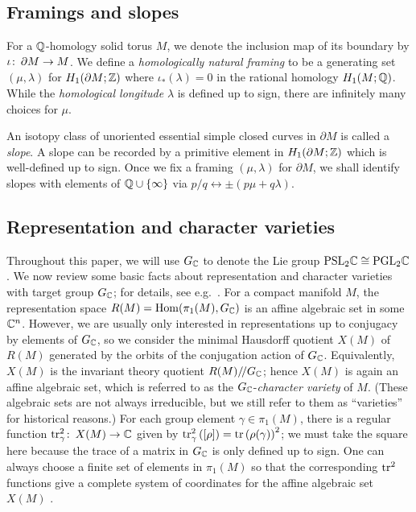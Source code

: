 \documentclass[tikz, sepfignums, defaultenums]{nmd/article}
\newcommand{\GC}{G_\C}
\newcommand{\sslash}{/\mkern-3mu/}
\newcommand{\inc}{\iota}
\begin{document}
\subsection{Framings and slopes}
\label{sec:framings}

For a ${\mathbb Q}$-homology solid torus $M$, we denote the inclusion map of
its boundary by $\inc \maps \partial M \to M$.  We define a
\emph{homologically natural framing} to be a generating set
$(\mu, \lambda)$ for $H_1(\partial M; {\mathbb Z})$ where
$\inc_*(\lambda) = 0$ in the rational homology $H_1(M; {\mathbb Q})$.  While
the \emph{homological longitude} $\lambda$ is defined up to sign,
there are infinitely many choices for $\mu$.

An isotopy class of unoriented essential simple closed curves in
$\partial M$ is called a \emph{slope}.  A slope can be recorded by a
primitive element in $H_1(\partial M; {\mathbb Z})$ which is well-defined up to
sign.  Once we fix a framing $(\mu, \lambda)$ for $\partial M$, we
shall identify slopes with elements of ${\mathbb Q} \cup \{\infty\}$ via
$p/q \leftrightarrow \pm(p \mu + q \lambda)$.

\subsection{Representation and character varieties} 
\label{sec:repcharvar}

Throughout this paper, we will use $\GC$ to denote the Lie group
$\mathrm{PSL}_{2} {\mathbb C} \cong \mathrm{PGL}_{2} {\mathbb C}$.  We now review some basic facts about
representation and character varieties with target group $\GC$; for
details, see e.g.~\cite{HeusenerPorti2004}.  For a compact manifold
$M$, the representation space $R(M) = \Hom(\pi_1(M), \GC)$ is an
affine algebraic set in some ${\mathbb C}^n$.  However, we are usually only
interested in representations up to conjugacy by elements of $\GC$, so
we consider the minimal Hausdorff quotient $X(M)$ of $R(M)$ generated
by the orbits of the conjugation action of $\GC$.  Equivalently,
$X(M)$ is the invariant theory quotient $R(M) \sslash \GC$; hence
$X(M)$ is again an affine algebraic set, which is referred to as the
$\GC$-\emph{character variety} of $M$.  (These algebraic sets are not
always irreducible, but we still refer to them as ``varieties'' for
historical reasons.)  For each group element $\gamma \in \pi_1(M)$,
there is a regular function $\operatorname{tr}^2_\gamma \colon\thinspace X(M) \to {\mathbb C}$ given by
$\operatorname{tr}^2_\gamma\left([\rho]\right) = \operatorname{tr}\left(\rho(\gamma)\right)^2$; we
must take the square here because the trace of a matrix in $\GC$ is
only defined up to sign.  One can always choose a finite set of
elements in $\pi_1(M)$ so that the corresponding $\operatorname{tr}^2$ functions
give a complete system of coordinates for the affine algebraic set
$X(M)$ \cite[Corollary 2.3]{HeusenerPorti2004}.
\end{document}
